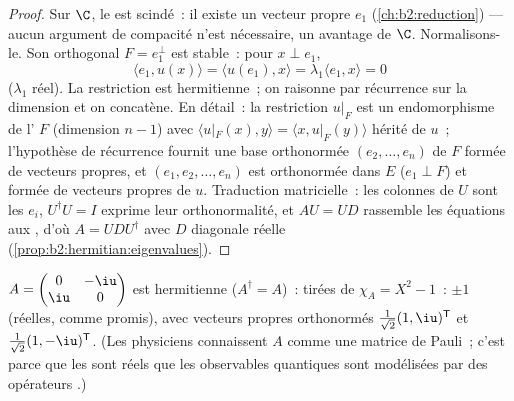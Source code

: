 \begin{proof}
Sur $\C$, le  est scindé~: il existe un
vecteur propre $e_1$ (\cref{ch:b2:reduction}) --- aucun argument de
compacité n'est nécessaire, un avantage de $\C$. Normalisons-le. Son
orthogonal $F = e_1^\perp$ est stable~: pour $x \perp e_1$,
\[
\langle e_1, u(x)\rangle = \langle u(e_1), x\rangle
= \lambda_1\langle e_1, x\rangle = 0
\]
($\lambda_1$ réel). La restriction est hermitienne~; on raisonne par
récurrence sur la dimension et on concatène. En détail~: la
restriction $u|_F$ est un endomorphisme de l' $F$
(dimension $n - 1$) avec $\langle u|_F(x), y\rangle = \langle x,
u|_F(y)\rangle$ hérité de $u$~; l'hypothèse de récurrence fournit une
base orthonormée $(e_2, \dots, e_n)$ de $F$ formée de vecteurs
propres, et $(e_1, e_2, \dots, e_n)$ est orthonormée dans $E$ ($e_1
\perp F$) et formée de vecteurs propres de $u$. Traduction
matricielle~: les colonnes de $U$ sont les $e_i$, $U^\dagger U = I$
exprime leur orthonormalité, et $AU = UD$ rassemble les équations aux
, d'où $A = UDU^\dagger$ avec $D$ diagonale réelle
(\cref{prop:b2:hermitian:eigenvalues}).
\end{proof}

\begin{example}\label{ex:b2:hermitian:pauli}
$A = \begin{pmatrix} 0 & -\iu\\ \iu & 0\end{pmatrix}$ est hermitienne
($A^\dagger = A$)~:  tirées de $\chi_A = X^2 - 1$~: $\pm
1$ (réelles, comme promis), avec vecteurs propres orthonormés
$\frac{1}{\sqrt2}(1, \iu)^{\mathsf T}$ et $\frac{1}{\sqrt2}(1,
-\iu)^{\mathsf T}$. (Les physiciens connaissent $A$ comme une matrice
de Pauli~; c'est parce que les   sont réels que les
observables quantiques sont modélisées par des opérateurs .)
\end{example}

